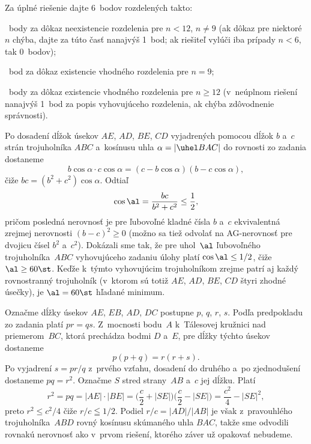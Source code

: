 {\nobreak\medskip\petit\noindent
Za úplné riešenie dajte 6~bodov rozdelených takto:

~body za dôkaz neexistencie rozdelenia pre $n <12$, $n \ne 9$
(ak dôkaz pre niektoré $n$ chýba, dajte za túto časť nanajvýš 1~bod; ak
riešiteľ vylúči iba prípady $n <6$, tak 0~bodov);

~bod za dôkaz existencie vhodného rozdelenia pre $n = 9$;

~body za dôkaz existencie vhodného rozdelenia pre $n \ge 12$
(v~neúplnom riešení nanajvýš 1~bod za popis vyhovujúceho rozdelenia,
ak chýba zdôvodnenie správnosti).

\endpetit
\bigbreak
}

{%
Po dosadení dĺžok úsekov $AE$, $AD$, $BE$, $CD$ vyjadrených
pomocou dĺžok $b$ a~$c$ strán trojuholníka $ABC$ a~kosínusu uhla
$\alpha=|\uhel BAC|$ do rovnosti zo zadania dostaneme
$$
b \cos \alpha \cdot c \cos \alpha = (c-b \cos \alpha) (b-c \cos \alpha),
$$
čiže $bc = (b^2+c^2) \cos \alpha$. Odtiaľ
$$
\cos\al=\frac{bc}{b^2+c^2}\le\frac12,
$$
pričom posledná nerovnosť je pre ľubovoľné kladné čísla $b$ a~$c$
ekvivalentná zrejmej nerovnosti $(b-c)^2\ge0$ (možno sa tiež
odvolať na AG-nerovnosť pre dvojicu čísel $b^2$ a~$c^2$).
Dokázali sme tak, že pre uhol~$\al$ ľubovoľného trojuholníka~$ABC$
vyhovujúceho zadaniu úlohy platí $\cos\al\le1/2$, čiže
$\al\ge60\st$. Keďže k~týmto vyhovujúcim trojuholníkom zrejme
patrí aj každý rovnostranný trojuholník (v~ktorom sú totiž $AE$, $AD$, $BE$,
$CD$ štyri zhodné úsečky), je $\al=60\st$ hľadané minimum.

\ineriesenie
Označme dĺžky úsekov $AE$, $EB$, $AD$, $DC$ postupne $p$, $q$, $r$,
$s$. Podľa predpokladu zo zadania platí $pr = qs$.
Z~mocnosti bodu~$A$ k~Tálesovej kružnici nad priemerom~$BC$, ktorá
prechádza bodmi $D$ a~$E$, pre dĺžky týchto úsekov dostaneme
$$
p (p+q) = r (r+s).
$$
Po vyjadrení $s= pr / q$ z~prvého vzťahu, dosadení do druhého
a~po zjednodušení dostaneme $pq = r^2$.
Označme $S$ stred strany~$AB$ a~$c$ jej dĺžku. Platí
$$
r^2 = pq = |AE| \cdot |BE| = \Big(\frac c2+|SE|\Big) \Big(\frac c2-|SE|\Big) = \frac{c^2}4-|SE|^2,
$$
preto $r^2 \le c^2/4$ čiže $r/c\leqq1/2$.
Podiel $r/c=|AD|/|AB|$ je
však z~pravouhlého trojuholníka~$ABD$ rovný kosínusu skúmaného uhla
$BAC$, takže sme odvodili rovnakú nerovnosť ako v~prvom
riešení, ktorého záver už opakovať nebudeme.

}
